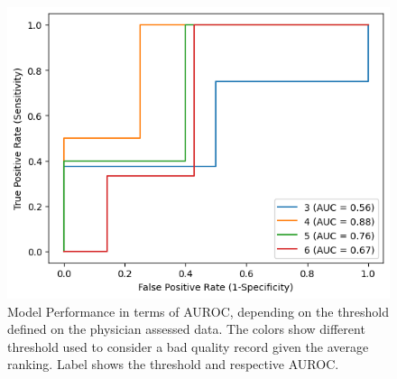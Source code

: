 \begin{figure}[htbp]
    \centering
    \caption{Model Performance in terms of AUROC, depending on the threshold defined on the physician assessed data. The colors show different threshold used to consider a bad quality record given the average ranking. Label shows the threshold and respective AUROC.}\label{fig:auc_changes} 
    \includegraphics[scale=0.78]{imgs/auroc_curve_threshold.png}
    \end{figure}
